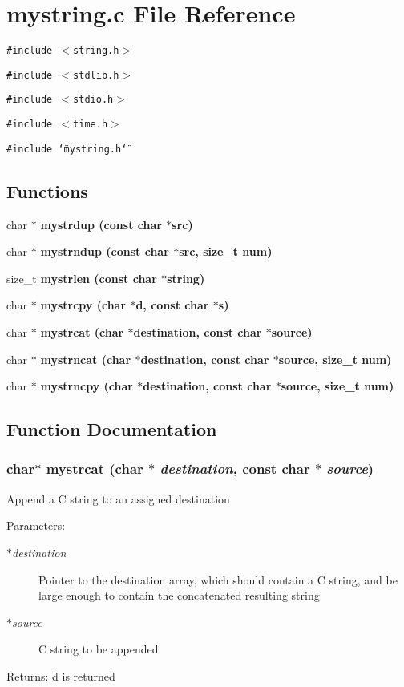 \section{mystring.c File Reference}
\label{mystring_8c}
{\tt \#include $<$string.h$>$}\par
{\tt \#include $<$stdlib.h$>$}\par
{\tt \#include $<$stdio.h$>$}\par
{\tt \#include $<$time.h$>$}\par
{\tt \#include \char`\"{}mystring.h\char`\"{}}\par
\subsection*{Functions}
\begin{CompactItemize}
\item 
char $\ast$ \bf{mystrdup} (const char $\ast$src)
\item 
char $\ast$ \bf{mystrndup} (const char $\ast$src, size\_\-t num)
\item 
size\_\-t \bf{mystrlen} (const char $\ast$string)
\item 
char $\ast$ \bf{mystrcpy} (char $\ast$d, const char $\ast$s)
\item 
char $\ast$ \bf{mystrcat} (char $\ast$destination, const char $\ast$source)
\item 
char $\ast$ \bf{mystrncat} (char $\ast$destination, const char $\ast$source, size\_\-t num)
\item 
char $\ast$ \bf{mystrncpy} (char $\ast$destination, const char $\ast$source, size\_\-t num)
\end{CompactItemize}


\subsection{Function Documentation}
\subsubsection{\setlength{\rightskip}{0pt plus 5cm}char$\ast$ mystrcat (char $\ast$ {\em destination}, const char $\ast$ {\em source})}\label{mystring_8c_7d6fc6523f6b6af2c4295c9c6b1bd78e}


Append a C string to an assigned destination \begin{Desc}
\item[Parameters:]
\begin{description}
\item[{\em $\ast$destination}]Pointer to the destination array, which should contain a C string, and be large enough to contain the concatenated resulting string \item[{\em $\ast$source}]C string to be appended \end{description}
\end{Desc}
\begin{Desc}
\item[Returns:]d is returned \end{Desc}
